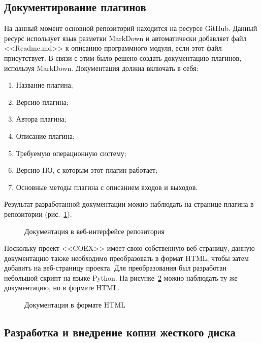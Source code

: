 \subsection{Документирование плагинов}

На данный момент основной репозиторий находится на ресурсе GitHub. Данный ресурс использует язык разметки MarkDown и автоматически добавляет файл <<Readme.md>> к описанию программного модуля, если этот файл присутствует. В связи с этим было решено создать документацию плагинов, используя MarkDown. Документация должна включать в себя:

\begin{enumerate}
  \item Название плагина;
  \item Версию плагина;
  \item Автора плагина;
  \item Описание плагина;
  \item Требуемую операционную систему;
  \item Версию ПО, с которым этот плагин работает;
  \item Основные методы плагина с описанием входов и выходов.
\end{enumerate}

Результат разработанной документации можно наблюдать на странице плагина в репозитории (рис.~\ref{bok_1:bok_1}).

\begin{figure}[!ht]
\caption{ Документация в веб-интерфейсе репозитория }
\label{bok_1:bok_1}
\end{figure}

Поскольку проект <<COEX>> имеет свою собственную веб-страницу, данную документацию также необходимо преобразовать в формат HTML, чтобы затем добавить на веб-страницу проекта. Для преобразования был разработан небольшой скрипт на языке Python. На рисунке~\ref{bok_2:bok_2} можно наблюдать ту же документацию, но в формате HTML.

\begin{figure}[!ht]
\caption{ Документация в формате HTML }
\label{bok_2:bok_2}
\end{figure}

\clearpage
\subsection{Разработка и внедрение копии жесткого диска}

